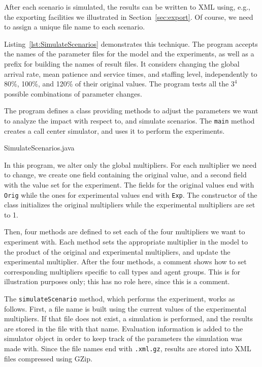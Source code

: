 After each scenario is simulated, the results can be written to XML
using, e.g., the exporting facilities we illustrated in
Section~\ref{sec:export}.
Of course, we need to assign a unique file name to each scenario.

Listing~\ref{lst:SimulateScenarios} demonstrates this technique.
The program accepts the names of the parameter files for the model and
the experiments, as well as a prefix for building the names of
result files.
It considers changing the global arrival rate, mean patience and
service times, and staffing level, independently
 to 80\%, 100\%, and 120\% of their
original values.
The program tests all the $3^4$ possible combinations of parameter changes.

The program defines a class providing methods to adjust the parameters we want
to analyze the impact with respect to, and simulate scenarios.
The \texttt{main} method creates a call center simulator, and uses it
to perform the experiments.


{SimulateScenarios.java}

In this program, we alter only the global multipliers.
For each multiplier we need to change, we create one field containing
the original value, and a second field with the value set for the experiment.
The fields for the original values end with \texttt{Orig} while the
ones for experimental values end with \texttt{Exp}.
The constructor of the class initializes the original multipliers
while the experimental multipliers are set to 1.

Then, four methods are defined to set each of the four multipliers we
want to experiment with.
Each method sets the appropriate multiplier in the model
to the product of the original and experimental multipliers,
and update the experimental multiplier.
After the four methods, a comment shows how to
set corresponding multipliers specific to call types and agent groups.
This is for illustration purposes only; this has no role here, since
this is a comment.

The \texttt{simulate\-Scenario} method, which performs the
experiment,
works as follows.
First, a file name is built using the current values of the
experimental multipliers.
If that file does not exist, a simulation is performed, and the
results are stored in the file with that name.
Evaluation information is added to the simulator object in order to
keep track of the parameters the simulation was made with.
Since the file names end with \texttt{.xml.gz}, results are stored
into XML files compressed using GZip.

